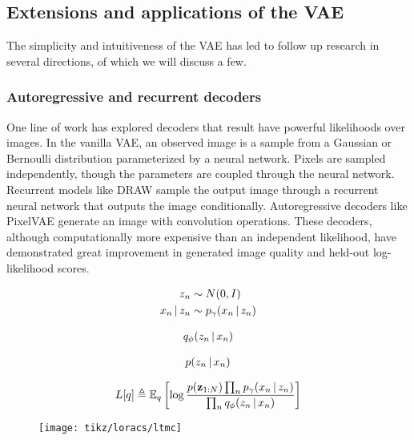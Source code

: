 \subsection{Extensions and applications of the VAE}
The simplicity and intuitiveness of the
VAE has led to follow up research
in several directions, of which we
will discuss a few.

\subsubsection{Autoregressive and recurrent decoders}
One line of work has explored
decoders that result have powerful
likelihoods over images.
In the vanilla VAE, an observed image
is a sample 
from a Gaussian 
or Bernoulli distribution
parameterized by a neural network.
Pixels are sampled independently,
though the parameters are coupled
through the neural network.
Recurrent models like 
DRAW \citep{Gregor2015}
sample the output image
through a recurrent
neural network that outputs
the image conditionally.
Autoregressive decoders
like PixelVAE \citep{Gulrajani2016}
generate an image with convolution
operations.
These decoders, although
computationally more
expensive than an independent likelihood,
have demonstrated great improvement in
generated image quality and 
held-out log-likelihood scores.


\iffalse

\begin{align*}
    z_n &\sim N(0, I) \\
    x_n \,|\, z_n &\sim p_\gamma(x_n \,|\, z_n)
\end{align*}

\begin{align*}
  q_\phi(z_n \,|\, x_n)
\end{align*}

\begin{align*}
  p(z_n \,|\, x_n)
\end{align*}

\begin{align*}
  L[q] \triangleq \mathbb{E}_q\left[\log \frac{p(\mathbf{z}_{1:N})\prod_n p_\gamma(x_n \,|\, z_n)}{\prod_n q_\phi(z_n \,|\, x_n)}\right]
\end{align*}

\begin{figure}
    \texttt{[image: tikz/loracs/ltmc]}
\end{figure}

